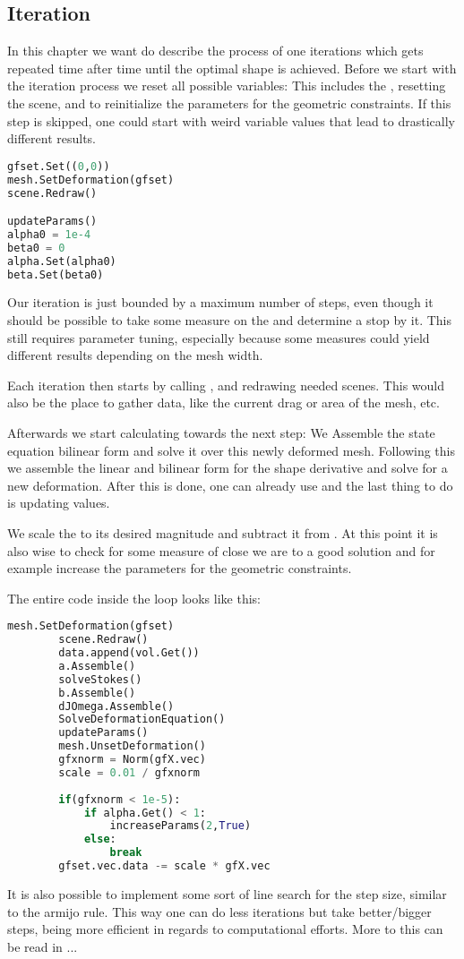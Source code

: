 \subsection{Iteration}
In this chapter we want do describe the process of one iterations which gets repeated time after time until the optimal shape is achieved.
Before we start with the iteration process we reset all possible variables:
This includes the , resetting the scene, and to reinitialize the parameters for the geometric constraints. If this step is skipped, one could start with weird variable values that lead to drastically different results.

\begin{lstlisting}[language=Python, title=Reset before iteration, label=lst:reset]
gfset.Set((0,0))
mesh.SetDeformation(gfset)
scene.Redraw()

updateParams()
alpha0 = 1e-4
beta0 = 0
alpha.Set(alpha0)
beta.Set(beta0)
\end{lstlisting}

Our iteration is just bounded by a maximum number of steps, even though it should be possible to take some measure on the  and determine a stop by it.
This still requires parameter tuning, especially because some measures could yield different results depending on the mesh width.

Each iteration then starts by calling , and redrawing needed scenes. This would also be the place to gather data, like the current drag or area of the mesh, etc.

Afterwards we start calculating towards the next step:
We Assemble the state equation bilinear form and solve it over this newly deformed mesh. Following this we assemble the linear and bilinear form for the shape derivative and solve for a new deformation. After this is done, one can already use  and the last thing to do is updating values.

We scale the  to its desired magnitude and subtract it from . At this point it is also wise to check for some measure of close we are to a good solution and for example increase the parameters for the geometric constraints.

The entire code inside the loop looks like this:

\begin{lstlisting}[language=Python, title=Iteration, label=lst:loop]
		mesh.SetDeformation(gfset)
		scene.Redraw()
		data.append(vol.Get())
		a.Assemble()
		solveStokes()
		b.Assemble()
		dJOmega.Assemble()
		SolveDeformationEquation()
		updateParams()
		mesh.UnsetDeformation()
		gfxnorm = Norm(gfX.vec)
		scale = 0.01 / gfxnorm
		
		if(gfxnorm < 1e-5):
			if alpha.Get() < 1:
				increaseParams(2,True)
			else:
				break
		gfset.vec.data -= scale * gfX.vec
\end{lstlisting}

It is also possible to implement some sort of line search for the step size, similar to the armijo rule. This way one can do less iterations but take better/bigger steps, being more efficient in regards to computational efforts. More to this can be read in ...